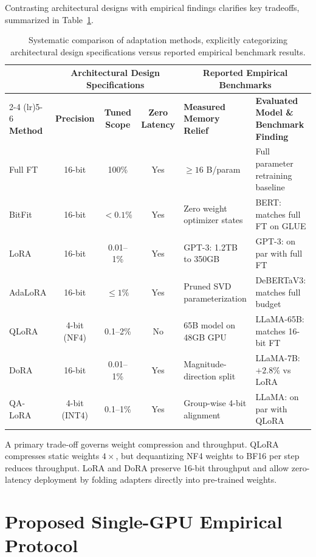 \documentclass[11pt,a4paper]{article}
\begin{document}
Contrasting architectural designs with empirical findings clarifies key tradeoffs, summarized in Table~\ref{tab:comparison}.

\begin{table}[htbp]
\centering
\scriptsize
\caption{Systematic comparison of adaptation methods, explicitly categorizing architectural design specifications versus reported empirical benchmark results.}
\label{tab:comparison}
\begin{tabularx}{\textwidth}{l c c c X X}
\toprule
 & \multicolumn{3}{c}{\textbf{Architectural Design Specifications}} & \multicolumn{2}{c}{\textbf{Reported Empirical Benchmarks}} \\
\cmidrule(lr){2-4} \cmidrule(lr){5-6}
\textbf{Method} & \textbf{Precision} & \textbf{Tuned Scope} & \textbf{Zero Latency} & \textbf{Measured Memory Relief} & \textbf{Evaluated Model \& Benchmark Finding} \\
\midrule
Full FT & 16-bit & 100\% & Yes & $\ge 16$ B/param & Full parameter retraining baseline \\
BitFit \cite{benzaken2021bitfit} & 16-bit & $<0.1\%$ & Yes & Zero weight optimizer states & BERT: matches full FT on GLUE \\
LoRA \cite{hu2021lora} & 16-bit & 0.01--1\% & Yes & GPT-3: 1.2TB to 350GB & GPT-3: on par with full FT \\
AdaLoRA \cite{zhang2023adalora} & 16-bit & $\le 1\%$ & Yes & Pruned SVD parameterization & DeBERTaV3: matches full budget \\
QLoRA \cite{dettmers2023qlora} & 4-bit (NF4) & 0.1--2\% & No & 65B model on 48GB GPU & LLaMA-65B: matches 16-bit FT \\
DoRA \cite{liu2024dora} & 16-bit & 0.01--1\% & Yes & Magnitude-direction split & LLaMA-7B: $+2.8\%$ vs LoRA \\
QA-LoRA \cite{xu2023qa} & 4-bit (INT4) & 0.1--1\% & Yes & Group-wise 4-bit alignment & LLaMA: on par with QLoRA \\
\bottomrule
\end{tabularx}
\end{table}

A primary trade-off governs weight compression and throughput. QLoRA compresses static weights $4\times$, but dequantizing NF4 weights to BF16 per step reduces throughput. LoRA and DoRA preserve 16-bit throughput and allow zero-latency deployment by folding adapters directly into pre-trained weights.

\section{Proposed Single-GPU Empirical Protocol}
\end{document}
